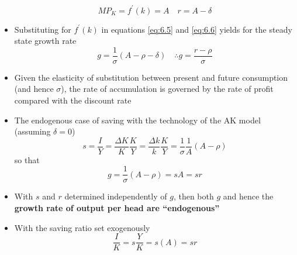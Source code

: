\documentclass{article}
\begin{document}
\begin{itemize}
	\begin{equation}
		MP_K = f^\prime(k) = A \quad r = A -\delta \label{eq:6.8}
	\end{equation}
	\item Substituting for \( f^\prime(k) \) in equations \ref{eq:6.5} and \ref{eq:6.6} yields for the steady state growth rate
	\begin{equation}
		g = \frac{1}{\sigma} (A -\rho -\delta) \quad \therefore g = \frac{r-\rho}{\sigma} \label{eq:6.9}
	\end{equation}
	\item Given the elasticity of substitution between present and future consumption (and hence \( \sigma \)), the rate of accumulation is governed by the rate of profit compared with the discount rate
	\item The endogenous case of saving with the technology of the AK model (assuming \( \delta = 0 \))
	\begin{equation}
		s = \frac{I}{Y} = \frac{\Delta K}{K}\frac{K}{Y} = \frac{\Delta k}{k}\frac{K}{Y} = \frac{1}{\sigma}\frac{1}{A}(A -\rho)
	\end{equation}
	so that
	\begin{equation}
		g = \frac{1}{\sigma} (A - \rho) = sA = sr \label{eq:6.11}
	\end{equation}
	\item With \( s \) and \( r \) determined independently of \( g \), then both \( g \) and hence the \textbf{growth rate of output per head are ``endogenous''}
	\item With the saving ratio set exogenously
	\begin{equation}
		\frac{I}{K} = s \frac{Y}{K} = s(A) = sr \label{eq:6.12}
	\end{equation}
\end{itemize}
\end{document}
